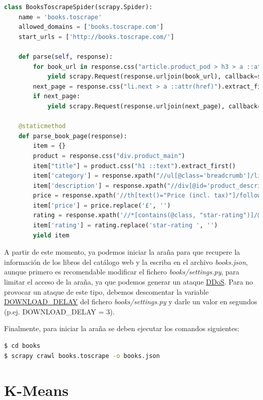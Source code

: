 \documentclass{uimppracticas}
\begin{document}
\begin{lstlisting}[language=python]
class BooksToscrapeSpider(scrapy.Spider):
	name = 'books.toscrape'
	allowed_domains = ['books.toscrape.com']
	start_urls = ['http://books.toscrape.com/']
	
	def parse(self, response):
		for book_url in response.css("article.product_pod > h3 > a ::attr(href)").extract():
			yield scrapy.Request(response.urljoin(book_url), callback=self.parse_book_page)
		next_page = response.css("li.next > a ::attr(href)").extract_first()
		if next_page:
			yield scrapy.Request(response.urljoin(next_page), callback=self.parse)
	
	@staticmethod
	def parse_book_page(response):
		item = {}
		product = response.css("div.product_main")
		item["title"] = product.css("h1 ::text").extract_first()
		item['category'] = response.xpath("//ul[@class='breadcrumb']/li[@class='active']/preceding-sibling::li[1]/a/text()").extract_first()
		item['description'] = response.xpath("//div[@id='product_description']/following-sibling::p/text()").extract_first()
		price = response.xpath('//th[text()="Price (incl. tax)"]/following-sibling::td/text()').extract_first()
		item['price'] = price.replace('£', '')
		rating = response.xpath('//*[contains(@class, "star-rating")]/@class').extract_first()
		item['rating'] = rating.replace('star-rating ', '')
		yield item
\end{lstlisting}

A partir de este momento, ya podemos iniciar la araña para que recupere la información de los libros del catálogo web y la escriba en el archivo \textit{books.json}, aunque primero es recomendable modificar el fichero \textit{books/settings.py}, para limitar el acceso de la araña, ya que podemos generar un ataque \href{https://es.wikipedia.org/wiki/Ataque\_de\_denegaci\%C3\%B3n_de_servicio}{DDoS}. Para no provocar un ataque de este tipo, debemos descomentar la variable \href{https://docs.scrapy.org/en/latest/topics/settings.html#download-delay}{DOWNLOAD\_DELAY} del fichero \textit{books/settings.py}  y darle un valor en segundos (p.ej. DOWNLOAD\_DELAY = 3). 

Finalmente, para iniciar la araña se deben ejecutar los comandos siguientes:	

\begin{lstlisting}[language=bash]
$ cd books
$ scrapy crawl books.toscrape -o books.json
\end{lstlisting}

\section{K-Means}\label{kmeans} 
\end{document}

